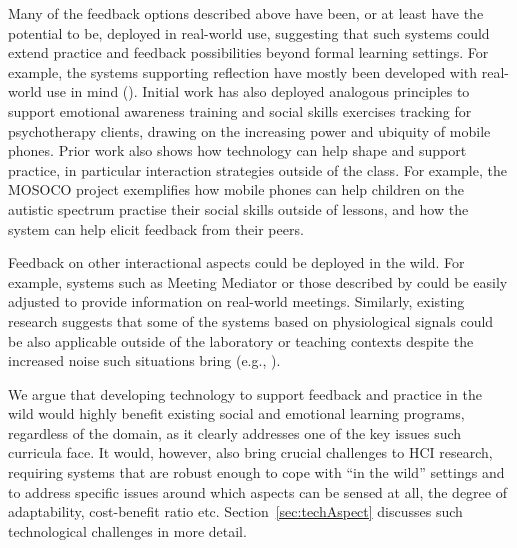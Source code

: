\documentclass[prodmode,acmtochi]{acmsmall}
\newcommand{\todo}[1]{\textrm{\textrm{\textcolor{LightBlue}{[[#1]]}}}}
\newcommand{\GeraldineFIX}[1]{}
\newcommand{\GeraldineTODO}[1]{}
\begin{document}
Many of the feedback options described above have been, or at least have the potential to be, deployed in real-world use, suggesting that such systems could extend practice and feedback possibilities beyond formal learning settings. 
%
For example, the systems supporting reflection have mostly been developed with real-world use in mind (\cite{McDuff2012,Balaam2011,Stahl2008,Moraveji2011}).  Initial work has also deployed analogous principles to support emotional awareness training \cite{Matthews2011} and social skills exercises tracking \cite{DeSa2010} for psychotherapy clients, drawing on the increasing power and ubiquity of mobile phones. 
%
Prior work also shows how technology can help shape and support practice, in particular interaction strategies outside of the class. For example, the MOSOCO project \cite{Escobedo2012,Tentori2010} exemplifies how mobile phones can help children on the autistic spectrum practise their social skills outside of lessons, and how the system can help elicit feedback from their peers. \GeraldineTODO{G: Such systems fit well with the emphasis on following pre-structured ways of reacting  in medical/education domains - don't get this sentence really?}

Feedback on other interactional aspects could be deployed in the wild. For example, systems such as Meeting Mediator \cite{Kim2008} or those described by  could be easily adjusted to provide information on real-world meetings. Similarly, existing research suggests that some of the systems based on physiological signals could be also applicable outside of the laboratory or teaching contexts despite the increased noise such situations bring (e.g., \cite{Pan2011}). 
%

We argue that developing technology to support feedback and practice in the wild would highly benefit existing social and emotional learning programs, regardless of the domain, as it clearly addresses one of the key issues such curricula face. It would, however, also bring crucial challenges to HCI research, requiring systems that are robust enough to cope with ``in the wild'' settings and to address specific issues around which aspects can be sensed at all, the degree of adaptability, cost-benefit ratio etc. Section~\ref{sec:techAspect} discusses such technological challenges in more detail.   
\GeraldineFIX{ G: AND.... elaborate more eg specific types of challenges ... capture, process, represent etc? devices? implicit vs explicit? degree of control/tailorability/personalisability? does it get shared, privacy etc? etc etc}
\end{document}
